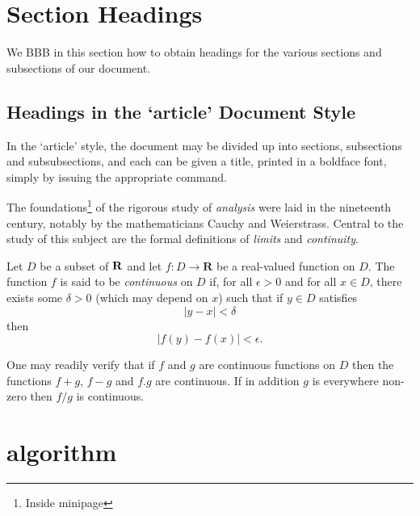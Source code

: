 \documentclass[a4paper,12pt]{msty}
\begin{document}
\begin{titlepage}
  \maketitle
  \thispagestyle{empty}
  
\end{titlepage}

\tableofcontents
\listoffigures
\listoftables

\newpage

\section{Section Headings}
We \citep{Ancey1996} BBB \citep{RR73} in this section how to obtain headings
for the various sections and subsections of our
document.
\subsection{Headings in the ‘article’ Document Style}
In the ‘article’ style, the document may be divided up
into sections, subsections and subsubsections, and each
can be given a title, printed in a boldface font,
simply by issuing the appropriate command.

The foundations\footnote{Inside minipage} of the rigorous study of \textit{analysis}
were laid in the nineteenth century, notably by the
mathematicians Cauchy and Weierstrass. Central to the
study of this subject are the formal definitions of
\textit{limits} and \textit{continuity}.

Let $D$ be a subset of $\bf R$ and let
$f \colon D \to \textbf{R}$ be a real-valued function on
$D$. The function $f$ is said to be \textit{continuous} on
$D$ if, for all $\epsilon > 0$ and for all $x \in D$,
there exists some $\delta > 0$ (which may depend on $x$)
such that if $y \in D$ satisfies
\[ |y - x| < \delta \]
then
\[ |f(y) - f(x)| < \epsilon. \]

One may readily verify that if $f$ and $g$ are continuous
functions on $D$ then the functions $f+g$, $f-g$ and
$f.g$ are continuous. If in addition $g$ is everywhere
non-zero then $f/g$ is continuous.

\section{algorithm}
\end{document}
